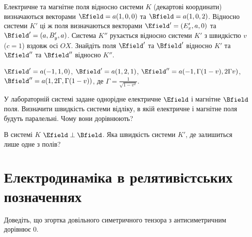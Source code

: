 \begin{problem}
Електричне та магнітне поля відносно системи $K$ (декартові координати) визначаються векторами $\Efield = a(1,0,0)$ та $\Bfield = a(1,0,2)$. Відносно системи $K'$ ці ж поля визначаються векторами $\Efield' = (E_x',a,0)$ та $\Bfield' = (a,B_y',a)$. Система $K''$ рухається відносно системи $K'$ з швидкістю $v$ ($c=1$) вздовж осі $OX$. Знайдіть поля  $\Efield'$ та $\Bfield'$ відносно $K'$ та $\Efield''$ та $\Bfield''$ відносно $K''$.
\begin{solution}
	$\Efield' = a(-1,1,0)$, $\Bfield' = a(1,2,1)$, $\Efield'' = a(-1,\Gamma(1- v),2\Gamma v)$, $\Bfield'' = a(1,2\Gamma,\Gamma(1- v))$, де $\Gamma = \frac{1}{\sqrt{1 - v^2}}$.
\end{solution}
\end{problem}


\begin{problem}
У лабораторній системі задане однорідне електричне $\Efield$ і магнітне $\Bfield$ поля. Визначити швидкість системи відліку, в якій електричне і магнітне поля будуть паралельні. Чому вони дорівнюють?
\end{problem}

\begin{problem}
В системі $K$ $\Efield\perp\Bfield$. Яка швидкість системи $K'$,  де залишиться лише одне з полів?
\end{problem}


\section{Електродинаміка в релятивістських позначеннях}

\begin{problem}
Доведіть, що  згортка довільного симетричного тензора з антисиметричним дорівнює $0$.
\end{problem}

